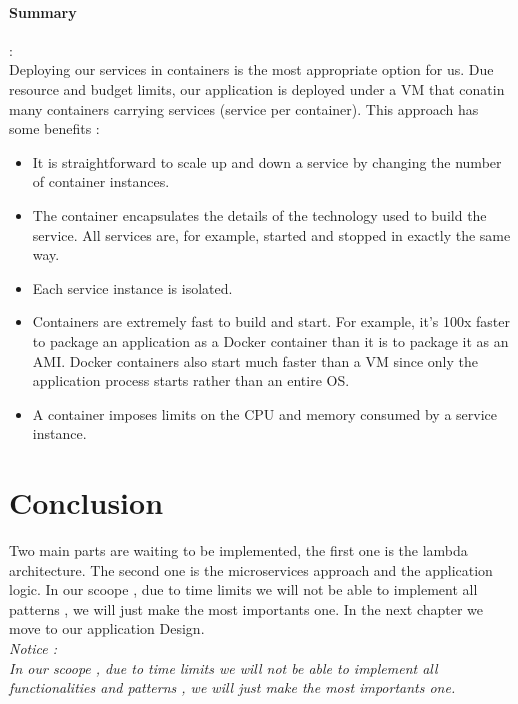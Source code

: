 \paragraph{Summary} :\\
\label{sec:sec01}
Deploying our services in containers is the most appropriate option for us. Due resource and budget limits, our application
is deployed under a VM that conatin many containers carrying services (service per container).
This approach has some benefits :   
\begin{itemize}
  \item It is straightforward to scale up and down a service by changing the number of container instances.
  \item The container encapsulates the details of the technology used to build the service. All services are, for example, started and stopped in exactly the same way.
  \item Each service instance is isolated.
  \item Containers are extremely fast to build and start. For example, it’s 100x faster to package an application as a Docker container than it is to package it as an AMI. Docker containers also start much faster than a VM since only the application process starts rather than an entire OS.
  \item A container imposes limits on the CPU and memory consumed by a service instance.  
 \end{itemize}

\section{ Conclusion }
\label{subsec:subsec01}
Two main parts are waiting to be implemented, the first one is the lambda architecture.
The second one is the microservices approach and the application logic.
In our scoope , due to time limits we will not be able to implement all patterns , we will just make the most importants one.
In the next chapter we move to our application Design.\\
\textit{
Notice :\\
In our scoope , due to time limits we will not be able to implement all functionalities and patterns , we will just make the most importants one.
}


